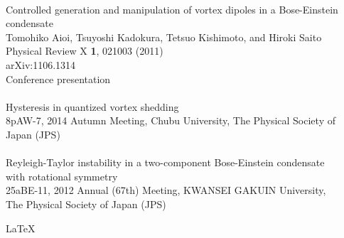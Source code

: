 \documentclass[12pt,a4paper]{report} %
\begin{document}
\\
Controlled generation and manipulation of vortex dipoles in a Bose-Einstein condensate 
\\
Tomohiko Aioi, Tsuyoshi Kadokura, Tetsuo Kishimoto, and Hiroki Saito 
\\
Physical Review X {\bf 1}, 021003 (2011) 
\\
arXiv:1106.1314
\newpage
\ 
\\
Conference presentation
\\
\\
Hysteresis in quantized vortex shedding
\\
8pAW-7, 2014 Autumn Meeting, Chubu University, The Physical Society of Japan (JPS)
\\
\\
Reyleigh-Taylor instability in a two-component Bose-Einstein condensate
\\
with rotational symmetry
\\
25aBE-11, 2012 Annual (67th) Meeting, KWANSEI GAKUIN University,
\\
The Physical Society of Japan (JPS)

\begin{flushright}
\LaTeX \\
\end{flushright}
\end{document}
